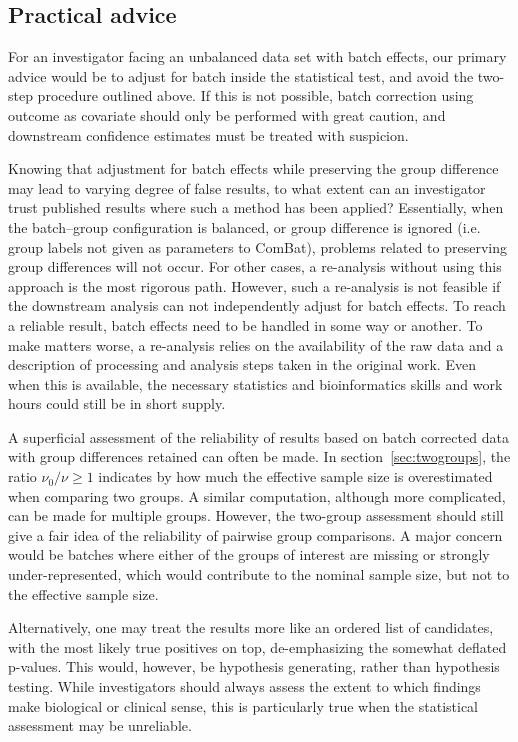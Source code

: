 \documentclass[oupdraft]{bio}
\begin{document}
\subsection{Practical advice}

For an investigator facing an unbalanced data set with batch effects, our primary advice would be to adjust for batch inside the statistical test, and avoid the two-step procedure outlined above. If this is not possible, batch correction using outcome as covariate should only be performed with great caution, and downstream confidence estimates must be treated with suspicion.

Knowing that adjustment for batch effects while preserving the group difference may lead to varying degree of false results, to what extent can an investigator trust published results where such a method has been applied? Essentially, when the batch--group configuration is balanced, or group difference is ignored  (i.e. group labels not given as parameters to ComBat), problems related to preserving group differences will not occur. For other cases, a re-analysis without using this approach is the most rigorous path. However, such a re-analysis is not feasible if the downstream  analysis can not independently adjust for batch effects. To reach a reliable result, batch effects need to be handled in some way or another. To make matters worse, a re-analysis relies on the availability of the raw data and a description of processing and analysis steps taken in the original work. Even when this is available, the necessary statistics and bioinformatics skills and work hours could still be in short supply.

A superficial assessment of the reliability of results based on batch corrected data with group differences retained can often be made.
In section~\ref{sec:twogroups}, the ratio $\nu_0/\nu\ge1$ indicates by how much the effective sample size is overestimated when comparing two groups. A similar computation, although more complicated, can be made for multiple groups. However, the two-group assessment should still give a fair idea of the reliability of pairwise group comparisons. A major concern would be batches where either of the groups of interest are missing or strongly under-represented, which would contribute to the nominal sample size, but not to the effective sample size.

Alternatively, one may treat the results more like an ordered list of candidates, with the most likely true positives on top, de-emphasizing the somewhat deflated p-values. This would, however, be hypothesis generating, rather than hypothesis testing. While investigators should always assess the extent to which findings make biological or clinical sense, this is particularly true when the statistical assessment may be unreliable.
\end{document}
